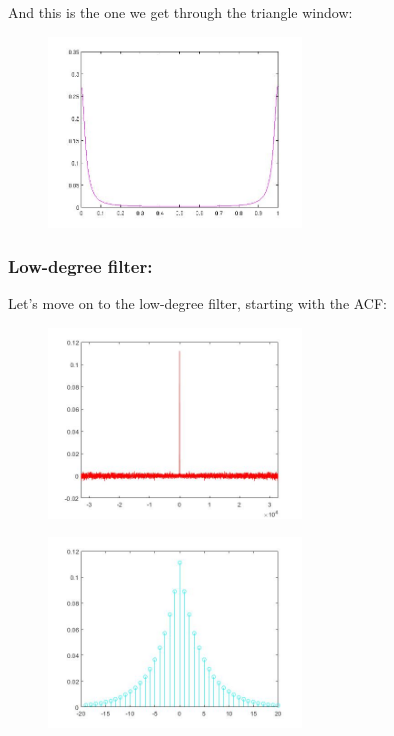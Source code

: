 \documentclass[a4paper,11pt]{article}
\begin{document}
And this is the one we get through the triangle window:

\begin{figure}[!hp]
    \begin{center}
    \includegraphics[width=0.6\textwidth]{images/lab2_redo_figure7.jpg}
    \end{center}
\end{figure}

\newpage

\subsubsection{Low-degree filter:}

Let's move on to the low-degree filter, starting with the ACF:

\begin{figure}[!hp]
    \begin{center}
    \includegraphics[width=0.6\textwidth]{images/lab2_figure3.jpg}
    \end{center}
\end{figure}

\begin{figure}[!hp]
    \begin{center}
    \includegraphics[width=0.6\textwidth]{images/lab2_figure2.jpg}
    \end{center}
\end{figure}
\end{document}
